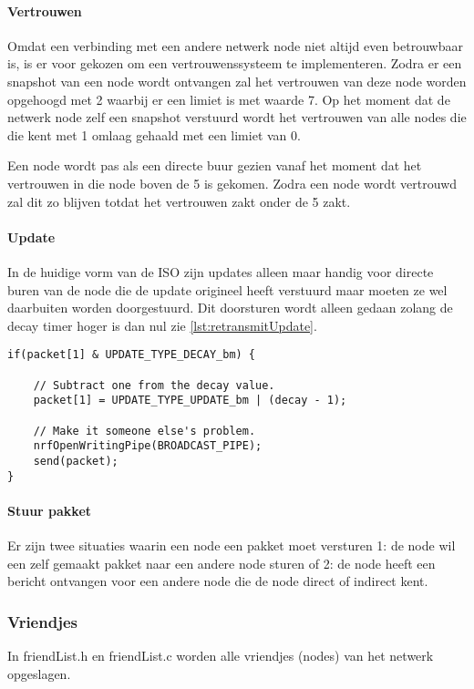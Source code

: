     \paragraph{Vertrouwen}
        Omdat een verbinding met een andere netwerk node niet altijd even betrouwbaar is, is er voor gekozen om een vertrouwenssysteem te implementeren. Zodra er een snapshot van een node wordt ontvangen zal het vertrouwen van deze node worden opgehoogd met 2 waarbij er een limiet is met waarde 7. Op het moment dat de netwerk node zelf een snapshot verstuurd wordt het vertrouwen van alle nodes die die kent met 1 omlaag gehaald met een limiet van 0. 

        Een node wordt pas als een directe buur gezien vanaf het moment dat het vertrouwen in die node boven de 5 is gekomen. Zodra een node wordt vertrouwd zal dit zo blijven totdat het vertrouwen zakt onder de 5 zakt.
    \paragraph{Update}
        In de huidige vorm van de ISO zijn updates alleen maar handig voor directe buren van de node die de update origineel heeft verstuurd maar moeten ze wel daarbuiten worden doorgestuurd. Dit doorsturen wordt alleen gedaan zolang de decay timer hoger is dan nul zie \autoref{lst:retransmitUpdate}.
\begin{lstlisting}[caption={Update doorsturen},captionpos=b,label={lst:retransmitUpdate},style=c]
if(packet[1] & UPDATE_TYPE_DECAY_bm) {

    // Subtract one from the decay value.
    packet[1] = UPDATE_TYPE_UPDATE_bm | (decay - 1);

    // Make it someone else's problem.
    nrfOpenWritingPipe(BROADCAST_PIPE);
    send(packet);
}
\end{lstlisting}

\newpage
    \paragraph{Stuur pakket}
    Er zijn twee situaties waarin een node een pakket moet versturen 1: de node wil een zelf gemaakt pakket naar een andere node sturen of 2: de node heeft een bericht ontvangen voor een andere node die de node direct of indirect kent.

\subsubsection{Vriendjes}
    In friendList.h en friendList.c worden alle vriendjes (nodes) van het netwerk opgeslagen. 
